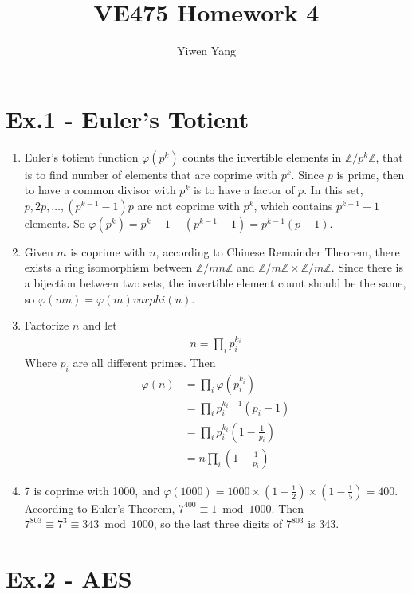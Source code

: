 \documentclass[12pt]{article}
\title{VE475 Homework 4}
\author{Yiwen Yang}
\begin{document}
\date{}
\maketitle

\section*{Ex.1 - Euler's Totient}

	\begin{enumerate}
		\item
			Euler's totient function $\varphi(p^k)$ counts the invertible elements in $\mathbb{Z}/p^k\mathbb{Z}$, that is to find number of elements that are coprime with $p^k$. Since $p$ is prime, then to have a common divisor with $p^k$ is to have a factor of $p$. In this set, $p,2p,\ldots,(p^{k-1}-1)p$ are not coprime with $p^k$, which contains $p^{k-1}-1$ elements. So $\varphi(p^k)=p^k-1-(p^{k-1}-1)=p^{k-1}(p-1)$.
		\item
			Given $m$ is coprime with $n$, according to Chinese Remainder Theorem, there exists a ring isomorphism between $\mathbb{Z}/mn\mathbb{Z}$ and $\mathbb{Z}/m\mathbb{Z}\times\mathbb{Z}/m\mathbb{Z}$. Since there is a bijection between two sets, the invertible element count should be the same, so $\varphi(mn)=\varphi(m)varphi(n)$.
		\item
			Factorize $n$ and let
			\begin{align*}
				n=\prod_{i}p_i^{k_i}
			\end{align*}
			Where $p_i$ are all different primes. Then
			\begin{align*}
				\varphi(n)&=\prod_{i}\varphi(p_i^{k_i})\\
				&=\prod_{i}p_i^{k_i-1}(p_i-1)\\
				&=\prod_{i}p_i^{k_i}(1-\frac{1}{p_i})\\
				&=n\prod_{i}(1-\frac{1}{p_i})
			\end{align*}
		\item
			7 is coprime with 1000, and $\varphi(1000)=1000\times (1-\frac{1}{2})\times (1-\frac{1}{5})=400$. According to Euler's Theorem, $7^{400}\equiv 1 \bmod 1000$. Then $7^{803}\equiv 7^{3} \equiv 343 \bmod 1000$, so the last three digits of $7^{803}$ is 343.
	\end{enumerate}

\newpage{}
\section*{Ex.2 - AES}
\end{document}
